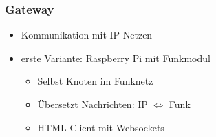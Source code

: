 \documentclass{beamer}
\begin{document}
\begin{frame}
    \frametitle{Gateway}

    \begin{itemize}
        \item Kommunikation mit IP-Netzen
        \item erste Variante: Raspberry Pi mit Funkmodul
            \begin{itemize}
                \item Selbst Knoten im Funknetz
                \item Übersetzt Nachrichten: IP $\Leftrightarrow$ Funk
                \item HTML-Client mit Websockets
            \end{itemize}
    \end{itemize}
\end{frame}

%
%
%

\nocite*
{}
\end{document}
